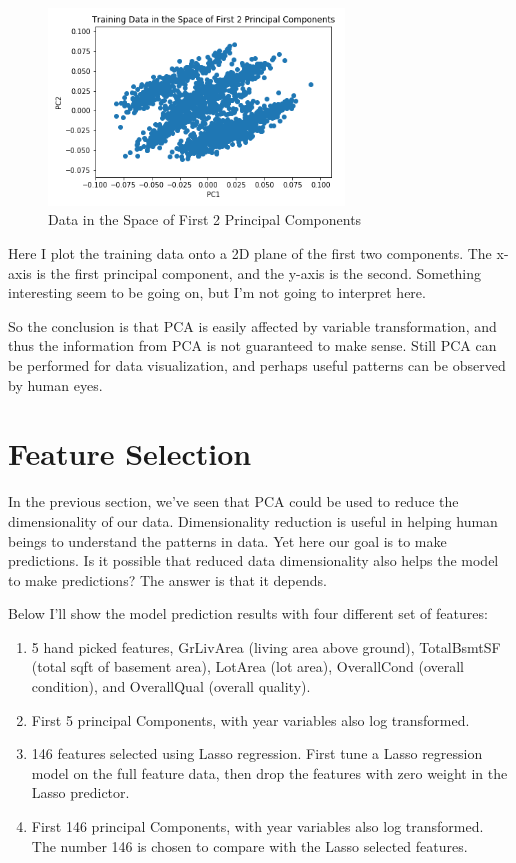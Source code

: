 \documentclass[a4paper]{article}
\begin{document}
\begin{figure}[H]
\centering
\includegraphics[width=0.7\textwidth]{data_pc_space.png}
\caption{Data in the Space of First 2 Principal Components}
\end{figure}

Here I plot the training data onto a 2D plane of the first two components. The x-axis is the first principal component, and the y-axis is the second. Something interesting seem to be going on, but I'm not going to interpret here.

So the conclusion is that PCA is easily affected by variable transformation, and thus the information from PCA is not guaranteed to make sense. Still PCA can be performed for data visualization, and perhaps useful patterns can be observed by human eyes.

\section{Feature Selection}
In the previous section, we've seen that PCA could be used to reduce the dimensionality of our data. Dimensionality reduction is useful in helping human beings to understand the patterns in data. Yet here our goal is to make predictions. Is it possible that reduced data dimensionality also helps the model to make predictions? The answer is that it depends. 

Below I'll show the model prediction results with four different set of features: 
\begin{enumerate}
  \item 5 hand picked features, GrLivArea (living area above ground), TotalBsmtSF (total sqft of basement area), LotArea (lot area), OverallCond (overall condition), and OverallQual (overall quality). 
  \item First 5 principal Components, with year variables also log transformed.
  \item 146 features selected using Lasso regression. First tune a Lasso regression model on the full feature data, then drop the features with zero weight in the Lasso predictor.
  \item First 146 principal Components, with year variables also log transformed. The number 146 is chosen to compare with the Lasso selected features.
\end{enumerate}
\end{document}

